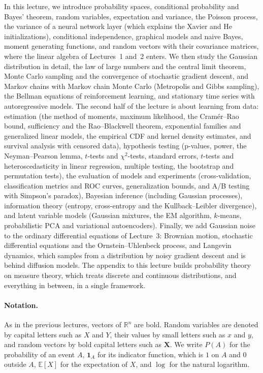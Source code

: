 \documentclass[11pt]{article}
\newcommand{\E}{\mathbb{E}}
\theoremstyle{definition}
\theoremstyle{plain}
\theoremstyle{remark}
\begin{document}
In this lecture, we introduce probability spaces, conditional probability and Bayes' theorem, random variables, expectation and variance, the Poisson process, the variance of a neural network layer (which explains the Xavier and He initializations), conditional independence, graphical models and naive Bayes, moment generating functions, and random vectors with their covariance matrices, where the linear algebra of Lectures~1 and~2 enters. We then study the Gaussian distribution in detail, the law of large numbers and the central limit theorem, Monte Carlo sampling and the convergence of stochastic gradient descent, and Markov chains with Markov chain Monte Carlo (Metropolis and Gibbs sampling), the Bellman equations of reinforcement learning, and stationary time series with autoregressive models. The second half of the lecture is about learning from data: estimation (the method of moments, maximum likelihood, the Cram\'er--Rao bound, sufficiency and the Rao--Blackwell theorem, exponential families and generalized linear models, the empirical CDF and kernel density estimates, and survival analysis with censored data), hypothesis testing (p-values, power, the Neyman--Pearson lemma, $t$-tests and $\chi^2$-tests, standard errors, $t$-tests and heteroscedasticity in linear regression, multiple testing, the bootstrap and permutation tests), the evaluation of models and experiments (cross-validation, classification metrics and ROC curves, generalization bounds, and A/B testing with Simpson's paradox), Bayesian inference (including Gaussian processes), information theory (entropy, cross-entropy and the Kullback--Leibler divergence), and latent variable models (Gaussian mixtures, the EM algorithm, $k$-means, probabilistic PCA and variational autoencoders). Finally, we add Gaussian noise to the ordinary differential equations of Lecture~3: Brownian motion, stochastic differential equations and the Ornstein--Uhlenbeck process, and Langevin dynamics, which samples from a distribution by noisy gradient descent and is behind diffusion models. The appendix to this lecture builds probability theory on measure theory, which treats discrete and continuous distributions, and everything in between, in a single framework.

\paragraph{Notation.} As in the previous lectures, vectors of $\mathbb{R}^n$ are bold. Random variables are denoted by capital letters such as $X$ and $Y$, their values by small letters such as $x$ and $y$, and random vectors by bold capital letters such as $\mathbf{X}$. We write $P(A)$ for the probability of an event $A$, $\mathbf{1}_A$ for its indicator function, which is $1$ on $A$ and $0$ outside $A$, $\E[X]$ for the expectation of $X$, and $\log$ for the natural logarithm.
\end{document}
